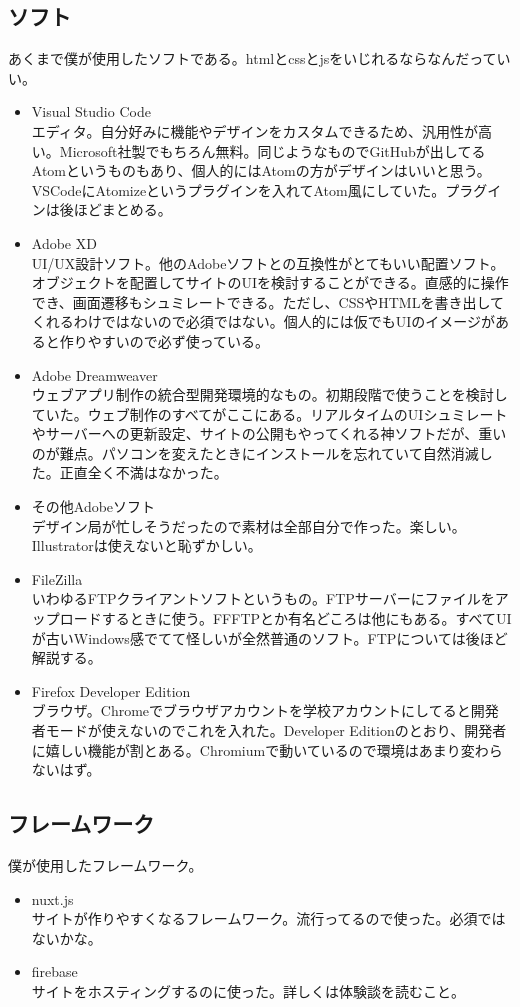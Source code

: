 \documentclass[dvipdfmx,jb5]{jarticle}
\begin{document}
 \subsection{ソフト}
 あくまで僕が使用したソフトである。htmlとcssとjsをいじれるならなんだっていい。
  \begin{itemize}
  \item Visual Studio Code\\
  エディタ。自分好みに機能やデザインをカスタムできるため、汎用性が高い。Microsoft社製でもちろん無料。同じようなものでGitHubが出してるAtomというものもあり、個人的にはAtomの方がデザインはいいと思う。VSCodeにAtomizeというプラグインを入れてAtom風にしていた。プラグインは後ほどまとめる。
  \item Adobe XD\\
  UI/UX設計ソフト。他のAdobeソフトとの互換性がとてもいい配置ソフト。オブジェクトを配置してサイトのUIを検討することができる。直感的に操作でき、画面遷移もシュミレートできる。ただし、CSSやHTMLを書き出してくれるわけではないので必須ではない。個人的には仮でもUIのイメージがあると作りやすいので必ず使っている。
  \item Adobe Dreamweaver\\
  ウェブアプリ制作の統合型開発環境的なもの。初期段階で使うことを検討していた。ウェブ制作のすべてがここにある。リアルタイムのUIシュミレートやサーバーへの更新設定、サイトの公開もやってくれる神ソフトだが、重いのが難点。パソコンを変えたときにインストールを忘れていて自然消滅した。正直全く不満はなかった。
  \item その他Adobeソフト\\
  デザイン局が忙しそうだったので素材は全部自分で作った。楽しい。Illustratorは使えないと恥ずかしい。
  \item FileZilla\\
  いわゆるFTPクライアントソフトというもの。FTPサーバーにファイルをアップロードするときに使う。FFFTPとか有名どころは他にもある。すべてUIが古いWindows感でてて怪しいが全然普通のソフト。FTPについては後ほど解説する。
  \item Firefox Developer Edition\\
  ブラウザ。Chromeでブラウザアカウントを学校アカウントにしてると開発者モードが使えないのでこれを入れた。Developer Editionのとおり、開発者に嬉しい機能が割とある。Chromiumで動いているので環境はあまり変わらないはず。
 \end{itemize}
 \subsection{フレームワーク}
 僕が使用したフレームワーク。
  \begin{itemize}
 \item nuxt.js\\
 サイトが作りやすくなるフレームワーク。流行ってるので使った。必須ではないかな。
 \item firebase\\
 サイトをホスティングするのに使った。詳しくは体験談を読むこと。
 \end{itemize}
\end{document}

